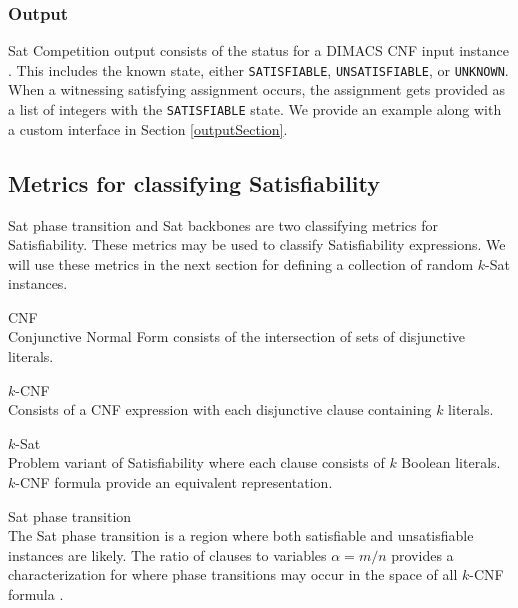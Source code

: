 		\subsubsection{Output}
		

{\sc Sat} Competition output consists of the status for a DIMACS CNF input instance \cite{satcompetition}.  This includes the known state, either \texttt{SATISFIABLE}, \texttt{UNSATISFIABLE}, or \texttt{UNKNOWN}.  When a witnessing satisfying assignment occurs, the assignment gets provided as a list of integers with the \texttt{SATISFIABLE} state.  We provide an example along with a custom interface in Section \ref{outputSection}.
	
	\subsection{Metrics for classifying {\sc Satisfiability}}

{\sc Sat} phase transition and {\sc Sat} backbones are two classifying metrics for {\sc Satisfiability}.  These metrics may be used to classify {\sc Satisfiability} expressions.  We will use these metrics in the next section for defining a collection of random $k$-{\sc Sat} instances.
		

\begin{definition}
CNF\\
Conjunctive Normal Form consists of the intersection of sets of disjunctive literals. 
\end{definition}

\begin{definition}
$k$-CNF\\
Consists of a CNF expression with each disjunctive clause containing $k$ literals.
\end{definition}

\begin{definition}
$k$-{\sc Sat}\\
Problem variant of {\sc Satisfiability} where each clause consists of $k$ Boolean literals.  $k$-CNF formula provide an equivalent representation.
\end{definition}

\begin{definition}
{\sc Sat} phase transition\\
The {\sc Sat} phase transition is a region where both satisfiable and unsatisfiable instances are likely.  The ratio of clauses to variables $\alpha = m/n$ provides a characterization for where phase transitions may occur in the space of all $k$-CNF formula \cite{Doherty08thehandbook,Gent94thesat}.
\end{definition}
		

